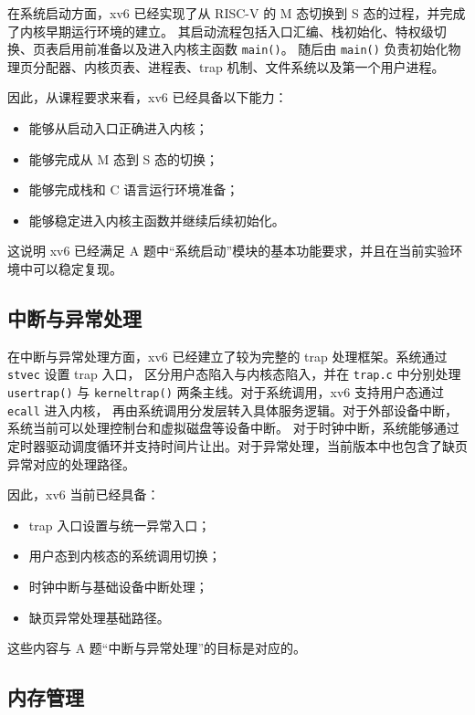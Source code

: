 \documentclass[12pt,a4paper]{ctexart}
\begin{document}
在系统启动方面，xv6 已经实现了从 RISC-V 的 M 态切换到 S 态的过程，并完成了内核早期运行环境的建立。
其启动流程包括入口汇编、栈初始化、特权级切换、页表启用前准备以及进入内核主函数 \texttt{main()}。
随后由 \texttt{main()} 负责初始化物理页分配器、内核页表、进程表、trap 机制、文件系统以及第一个用户进程。

因此，从课程要求来看，xv6 已经具备以下能力：

\begin{itemize}
  \item 能够从启动入口正确进入内核；
  \item 能够完成从 M 态到 S 态的切换；
  \item 能够完成栈和 C 语言运行环境准备；
  \item 能够稳定进入内核主函数并继续后续初始化。
\end{itemize}

这说明 xv6 已经满足 A 题中“系统启动”模块的基本功能要求，并且在当前实验环境中可以稳定复现。

\subsection{中断与异常处理}

在中断与异常处理方面，xv6 已经建立了较为完整的 trap 处理框架。系统通过 \texttt{stvec} 设置 trap 入口，
区分用户态陷入与内核态陷入，并在 \texttt{trap.c} 中分别处理 \texttt{usertrap()} 与
\texttt{kerneltrap()} 两条主线。对于系统调用，xv6 支持用户态通过 \texttt{ecall} 进入内核，
再由系统调用分发层转入具体服务逻辑。对于外部设备中断，系统当前可以处理控制台和虚拟磁盘等设备中断。
对于时钟中断，系统能够通过定时器驱动调度循环并支持时间片让出。对于异常处理，当前版本中也包含了缺页异常对应的处理路径。

因此，xv6 当前已经具备：

\begin{itemize}
  \item trap 入口设置与统一异常入口；
  \item 用户态到内核态的系统调用切换；
  \item 时钟中断与基础设备中断处理；
  \item 缺页异常处理基础路径。
\end{itemize}

这些内容与 A 题“中断与异常处理”的目标是对应的。

\subsection{内存管理}
\end{document}
